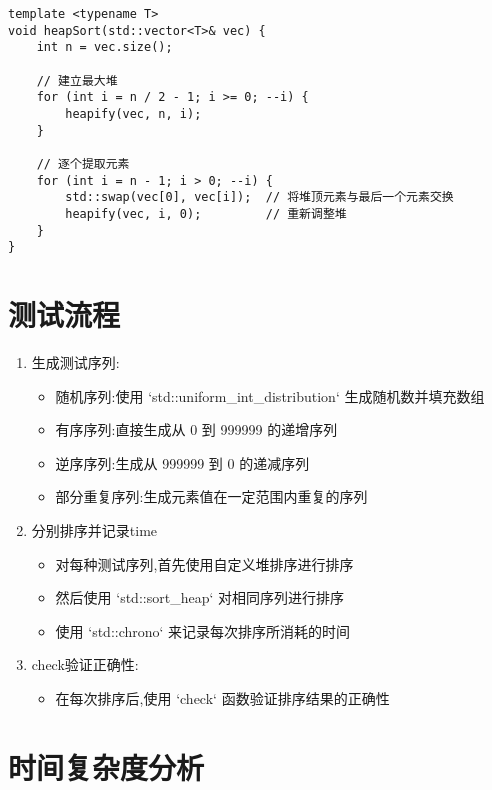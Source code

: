 \documentclass[UTF8]{ctexart}
\begin{document}
\begin{verbatim}
template <typename T>
void heapSort(std::vector<T>& vec) {
    int n = vec.size();

    // 建立最大堆
    for (int i = n / 2 - 1; i >= 0; --i) {
        heapify(vec, n, i);
    }

    // 逐个提取元素
    for (int i = n - 1; i > 0; --i) {
        std::swap(vec[0], vec[i]);  // 将堆顶元素与最后一个元素交换
        heapify(vec, i, 0);         // 重新调整堆
    }
}
\end{verbatim}

\section{测试流程}
\begin{enumerate}
    \item 生成测试序列:
    \begin{itemize}
        \item 随机序列:使用 `std::uniform\_int\_distribution` 生成随机数并填充数组
        \item 有序序列:直接生成从 0 到 999999 的递增序列
        \item 逆序序列:生成从 999999 到 0 的递减序列
        \item 部分重复序列:生成元素值在一定范围内重复的序列
    \end{itemize}
    
    \item 分别排序并记录time    \begin{itemize}
        \item 对每种测试序列,首先使用自定义堆排序进行排序
        \item 然后使用 `std::sort\_heap` 对相同序列进行排序
        \item 使用 `std::chrono` 来记录每次排序所消耗的时间
    \end{itemize}
    
    \item check验证正确性:
    \begin{itemize}
        \item 在每次排序后,使用 `check` 函数验证排序结果的正确性
    \end{itemize}
\end{enumerate}

\section{时间复杂度分析}
\end{document}
